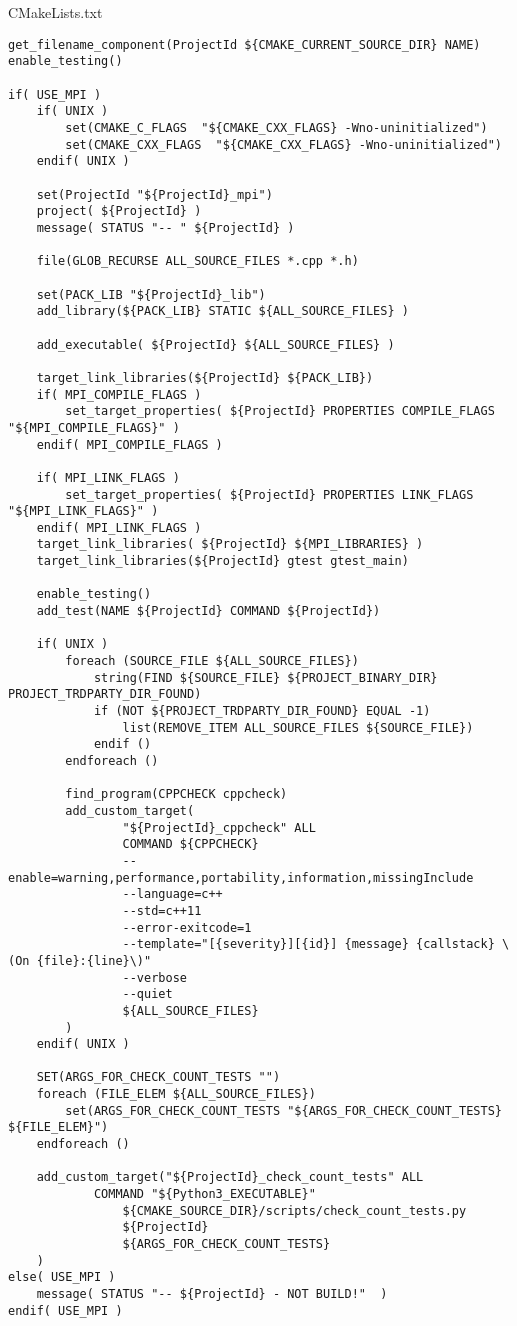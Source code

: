 \documentclass[12pt,a4paper]{article}
\begin{document}
\section{}CMakeLists.txt
\begin{lstlisting}
get_filename_component(ProjectId ${CMAKE_CURRENT_SOURCE_DIR} NAME)
enable_testing()

if( USE_MPI )
    if( UNIX )
        set(CMAKE_C_FLAGS  "${CMAKE_CXX_FLAGS} -Wno-uninitialized")
        set(CMAKE_CXX_FLAGS  "${CMAKE_CXX_FLAGS} -Wno-uninitialized")
    endif( UNIX )

    set(ProjectId "${ProjectId}_mpi")
    project( ${ProjectId} )
    message( STATUS "-- " ${ProjectId} )

    file(GLOB_RECURSE ALL_SOURCE_FILES *.cpp *.h)

    set(PACK_LIB "${ProjectId}_lib")
    add_library(${PACK_LIB} STATIC ${ALL_SOURCE_FILES} )

    add_executable( ${ProjectId} ${ALL_SOURCE_FILES} )

    target_link_libraries(${ProjectId} ${PACK_LIB})
    if( MPI_COMPILE_FLAGS )
        set_target_properties( ${ProjectId} PROPERTIES COMPILE_FLAGS "${MPI_COMPILE_FLAGS}" )
    endif( MPI_COMPILE_FLAGS )

    if( MPI_LINK_FLAGS )
        set_target_properties( ${ProjectId} PROPERTIES LINK_FLAGS "${MPI_LINK_FLAGS}" )
    endif( MPI_LINK_FLAGS )
    target_link_libraries( ${ProjectId} ${MPI_LIBRARIES} )
    target_link_libraries(${ProjectId} gtest gtest_main)

    enable_testing()
    add_test(NAME ${ProjectId} COMMAND ${ProjectId})

    if( UNIX )
        foreach (SOURCE_FILE ${ALL_SOURCE_FILES})
            string(FIND ${SOURCE_FILE} ${PROJECT_BINARY_DIR} PROJECT_TRDPARTY_DIR_FOUND)
            if (NOT ${PROJECT_TRDPARTY_DIR_FOUND} EQUAL -1)
                list(REMOVE_ITEM ALL_SOURCE_FILES ${SOURCE_FILE})
            endif ()
        endforeach ()

        find_program(CPPCHECK cppcheck)
        add_custom_target(
                "${ProjectId}_cppcheck" ALL
                COMMAND ${CPPCHECK}
                --enable=warning,performance,portability,information,missingInclude
                --language=c++
                --std=c++11
                --error-exitcode=1
                --template="[{severity}][{id}] {message} {callstack} \(On {file}:{line}\)"
                --verbose
                --quiet
                ${ALL_SOURCE_FILES}
        )
    endif( UNIX )

    SET(ARGS_FOR_CHECK_COUNT_TESTS "")
    foreach (FILE_ELEM ${ALL_SOURCE_FILES})
        set(ARGS_FOR_CHECK_COUNT_TESTS "${ARGS_FOR_CHECK_COUNT_TESTS} ${FILE_ELEM}")
    endforeach ()

    add_custom_target("${ProjectId}_check_count_tests" ALL
            COMMAND "${Python3_EXECUTABLE}"
                ${CMAKE_SOURCE_DIR}/scripts/check_count_tests.py
                ${ProjectId}
                ${ARGS_FOR_CHECK_COUNT_TESTS}
    )
else( USE_MPI )
    message( STATUS "-- ${ProjectId} - NOT BUILD!"  )
endif( USE_MPI )
\end{lstlisting}
\end{document}

